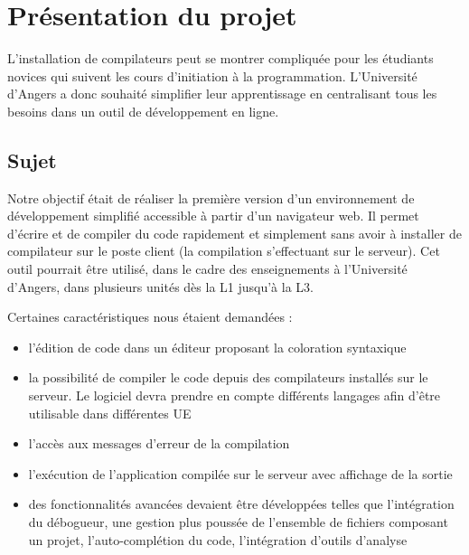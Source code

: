 \chapter{Présentation du projet}

\par L'installation de compilateurs peut se montrer compliquée pour les étudiants novices qui suivent les cours d'initiation à la programmation. L'Université d'Angers a donc souhaité simplifier leur apprentissage en centralisant tous les besoins dans un outil de développement en ligne.

\section{Sujet}

\par Notre objectif était de réaliser la première version d'un environnement de développement simplifié accessible à partir d'un navigateur web. Il permet d'écrire et de compiler du code rapidement et simplement sans avoir à installer de compilateur sur le poste client (la compilation s'effectuant sur le serveur). Cet outil pourrait être utilisé, dans le cadre des enseignements à l'Université d'Angers, dans plusieurs unités dès la L1 jusqu'à la L3. \\

\par Certaines caractéristiques nous étaient demandées : 

\begin{itemize}

	\item l'édition de code dans un éditeur proposant la coloration syntaxique
	\item la possibilité de compiler le code depuis des compilateurs installés sur le serveur. Le logiciel devra prendre en compte différents langages afin d’être utilisable dans différentes UE
	\item l'accès aux messages d'erreur de la compilation
	\item l'exécution de l'application compilée sur le serveur avec affichage de la sortie
	\item des fonctionnalités avancées devaient être développées telles que l’intégration du débogueur, une gestion plus poussée de l’ensemble de fichiers composant un projet, l'auto-complétion du code, l'intégration d’outils d’analyse

\end{itemize}


